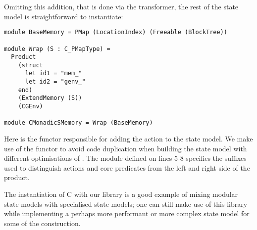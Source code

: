 Omitting this addition, that is done via the  transformer, the rest of the state model is straightforward to instantiate: \begin{lstlisting}
module BaseMemory = PMap (LocationIndex) (Freeable (BlockTree))

module Wrap (S : C_PMapType) =
  Product
    (struct
      let id1 = "mem_"
      let id2 = "genv_"
    end)
    (ExtendMemory (S))
    (CGEnv)

module CMonadicSMemory = Wrap (BaseMemory)
\end{lstlisting}
Here  is the functor responsible for adding the  action to the state model. We make use of the  functor to avoid code duplication when building the state model with different optimisations of \PMap{}. The module defined on lines 5-8 specifies the suffixes used to distinguish actions and core predicates from the left and right side of the product.

The instantiation of C with our library is a good example of mixing modular state models with specialised state models; one can still make use of this library while implementing a perhaps more performant or more complex state model for some of the construction.








